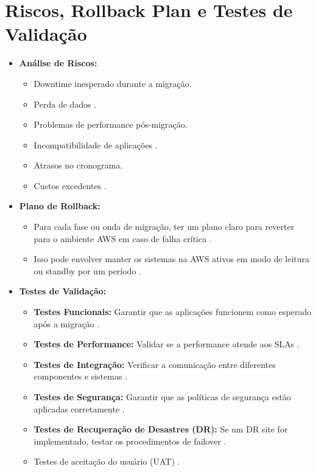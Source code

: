 \documentclass[
	12pt,				%
	oneside,			%
	a4paper,			%
	english,			%
	brazil				%
	]{abntex2unama}
\begin{document}
\section{Riscos, Rollback Plan e Testes de Validação}
\begin{itemize}
	\item \textbf{Análise de Riscos:}
	      \begin{itemize}
		      \item Downtime inesperado durante a migração.
		      \item Perda de dados \cite{disaster_recovery}.
		      \item Problemas de performance pós-migração.
		      \item Incompatibilidade de aplicações \cite{software_defined}.
		      \item Atrasos no cronograma.
		      \item Custos excedentes \cite{capacity_planning}.
	      \end{itemize}
	\item \textbf{Plano de Rollback:}
	      \begin{itemize}
		      \item Para cada fase ou onda de migração, ter um plano claro para reverter para o ambiente AWS em caso de falha crítica \cite{disaster_recovery}.
		      \item Isso pode envolver manter os sistemas na AWS ativos em modo de leitura ou standby por um período \cite{cloud_infrastructure}.
	      \end{itemize}
	\item \textbf{Testes de Validação:}
	      \begin{itemize}
		      \item \textbf{Testes Funcionais:} Garantir que as aplicações funcionem como esperado após a migração \cite{datacenter_monitoring}.
		      \item \textbf{Testes de Performance:} Validar se a performance atende aos SLAs \cite{reliability_engineering}.
		      \item \textbf{Testes de Integração:} Verificar a comunicação entre diferentes componentes e sistemas \cite{network_fabric}.
		      \item \textbf{Testes de Segurança:} Garantir que as políticas de segurança estão aplicadas corretamente \cite{datacenter_security}.
		      \item \textbf{Testes de Recuperação de Desastres (DR):} Se um DR site for implementado, testar os procedimentos de failover \cite{disaster_recovery}.
		      \item Testes de aceitação do usuário (UAT) \cite{dcim_systems}.
	      \end{itemize}
\end{itemize}
\end{document}
